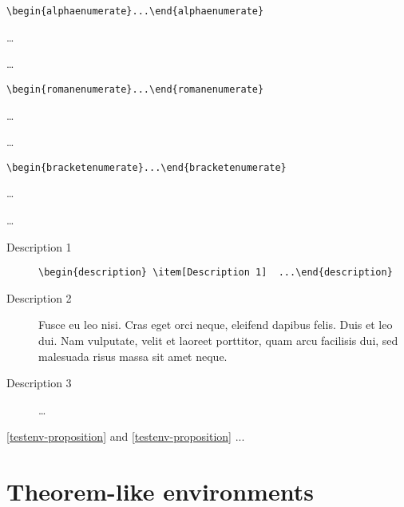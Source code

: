 \documentclass[a4paper,USenglish,cleveref,autoref,thm-restate]{lipics-v2019}
\begin{document}
\begin{alphaenumerate}
\item \verb|\begin{alphaenumerate}...\end{alphaenumerate}|
\item \dots
\item \dots
\end{alphaenumerate}

\begin{romanenumerate}
\item \verb|\begin{romanenumerate}...\end{romanenumerate}|
\item \dots
\item \dots
\end{romanenumerate}

\begin{bracketenumerate}
\item \verb|\begin{bracketenumerate}...\end{bracketenumerate}|
\item \dots
\item \dots
\end{bracketenumerate}

\begin{description}
\item[Description 1] \verb|\begin{description} \item[Description 1]  ...\end{description}|
\item[Description 2] Fusce eu leo nisi. Cras eget orci neque, eleifend dapibus felis. Duis et leo dui. Nam vulputate, velit et laoreet porttitor, quam arcu facilisis dui, sed malesuada risus massa sit amet neque.
\item[Description 3]  \dots
\end{description}

\cref{testenv-proposition} and \autoref{testenv-proposition} ...

\section{Theorem-like environments}\label{sec:theorem-environments}
\end{document}
